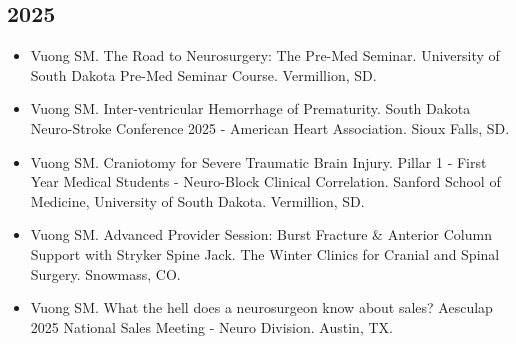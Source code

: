 \documentclass[11pt, a4paper]{article}
\begin{document}
\subsection{2025}
\begin{itemize}
  \setlength\itemindent{0.25em}
  \item Vuong SM. The Road to Neurosurgery: The Pre-Med Seminar. University of South Dakota Pre-Med Seminar Course. Vermillion, SD.
  \item Vuong SM. Inter-ventricular Hemorrhage of Prematurity. South Dakota Neuro-Stroke Conference 2025 - American Heart Association. Sioux Falls, SD.
  \item Vuong SM. Craniotomy for Severe Traumatic Brain Injury. Pillar 1 - First Year Medical Students - Neuro-Block Clinical Correlation. Sanford School of Medicine, University of South Dakota. Vermillion, SD.
  \item Vuong SM. Advanced Provider Session: Burst Fracture \& Anterior Column Support with Stryker Spine Jack. The Winter Clinics for Cranial and Spinal Surgery. Snowmass, CO.
  \item Vuong SM. What the hell does a neurosurgeon know about sales? Aesculap 2025 National Sales Meeting - Neuro Division. Austin, TX.
\end{itemize}
\end{document}
